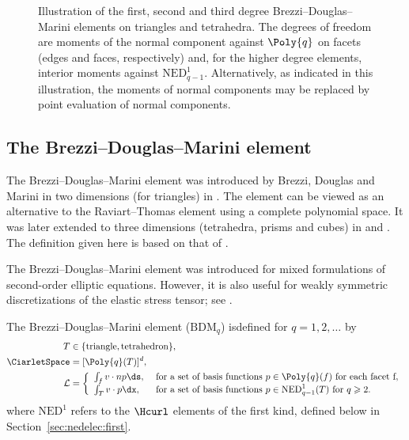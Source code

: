 \begin{figure}[t!]
  \caption{Illustration of the first, second and third degree
    Brezzi--Douglas--Marini elements on triangles and tetrahedra.
    The degrees of freedom are moments of the normal component
    against $\Poly{q}$ on facets (edges and faces, respectively)
    and, for the higher degree elements, interior moments against
    $\mathrm{NED}^1_{q-1}$. Alternatively, as indicated in this
    illustration, the moments of normal components may be replaced
    by point evaluation of normal components.}
  \label{kirby-6:fig:bdm}
\end{figure}


\subsection{The Brezzi--Douglas--Marini element}

The Brezzi--Douglas--Marini element was introduced by Brezzi,
Douglas and Marini in two dimensions (for triangles) in
\citet{BrezziDouglasMarini1985}. The element can be viewed as
an alternative to the Raviart--Thomas element using a complete
polynomial space. It was later extended to three dimensions
(tetrahedra, prisms and cubes) in \citet{Nedelec1986} and
\citet{BrezziDouglasDuranFortin1987}. The definition given here is based
on that of \citet{Nedelec1986}.

The Brezzi--Douglas--Marini element was introduced for mixed
formulations of second-order elliptic equations. However, it is also
useful for weakly symmetric discretizations of the elastic stress
tensor; see \citet{FarhloulFortin1997, ArnoldFalkWinther2007}.

\begin{definition}
  The Brezzi--Douglas--Marini element ($\mathrm{BDM}_q$)
  is\break \hbox{defined} for $q = 1, 2, \dots$ by
  \begin{align}
    T &\in \{ \mathrm{triangle}{}, \mathrm{tetrahedron}{}\}, \\
    \CiarletSpace &= [\Poly{q}(T)]^d, \\
    \mathcal{L} &=
    \left \{
    \begin{array}{ll}
      \int_{f} v \cdot n p \ds,
      & \text{ for a set of basis functions } p \in \Poly{q}(f)
      \text{ for each facet } $f$, \\
      \int_{T} v \cdot p \dx, &
      \text{ for a set of basis functions } p \in \mathrm{NED}^1_{q-1}(T)
      \text{ for } q \geqslant 2. \\
    \end{array}
    \right.
  \end{align}
  where $\mathrm{NED}^1$ refers to the \nedelec{} $\Hcurl$ elements of
  the first kind, defined below in Section~\ref{sec:nedelec:first}.
\end{definition}


